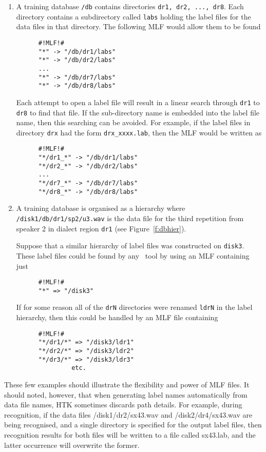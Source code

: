 \begin{enumerate}
\item
A training database \texttt{/db} contains directories \texttt{dr1, dr2, ..., dr8}.
Each directory contains a subdirectory called \texttt{labs} holding the
label files for the data files in that directory.  The following
MLF would allow them to be found
\begin{verbatim}
      #!MLF!#
      "*" -> "/db/dr1/labs"
      "*" -> "/db/dr2/labs"
      ...
      "*" -> "/db/dr7/labs"
      "*" -> "/db/dr8/labs"
\end{verbatim}      
Each attempt to open a label file will result in a linear search
through \texttt{dr1} to \texttt{dr8} to find that file.  If the sub-directory name
is embedded into the label file name, then this searching can
be avoided.  For example, if the label files in directory \texttt{drx} had
the form \texttt{drx\_xxxx.lab}, then the MLF would be written as
\begin{verbatim}
      #!MLF!#
      "*/dr1_*" -> "/db/dr1/labs"
      "*/dr2_*" -> "/db/dr2/labs"
      ...
      "*/dr7_*" -> "/db/dr7/labs"
      "*/dr8_*" -> "/db/dr8/labs"
\end{verbatim}   

\item
A training database is organised as a hierarchy where 
\texttt{/disk1/db/dr1/sp2/u3.wav} is the data file for the third
repetition from speaker 2 in dialect region \texttt{dr1}
(see Figure~\ref{f:dbhier}).  


Suppose
that a similar hierarchy of label files was constructed on
\texttt{disk3}.
These label files could be found by any \HTK\ tool by using an
MLF containing just
\begin{verbatim}
      #!MLF!#
      "*" => "/disk3"
\end{verbatim}      
If for some reason all of the \texttt{drN} directories were
renamed \texttt{ldrN} in the label hierarchy, then this could be
handled by an MLF file containing
\begin{verbatim}
      #!MLF!#
      "*/dr1/*" => "/disk3/ldr1"
      "*/dr2/*" => "/disk3/ldr2"
      "*/dr3/*" => "/disk3/ldr3"
               etc.
\end{verbatim}      
\end{enumerate}
These few examples should illustrate the flexibility and power of MLF files.
It should noted, however, that when generating label names automatically from data file names, HTK sometimes discards path details. For example, during recognition, if the data files /disk1/dr2/sx43.wav and /disk2/dr4/sx43.wav are being recognised, and a single directory is specified for the output label files, then recognition results for both files will be written to a file called sx43.lab, and the latter occurrence will overwrite the former.


